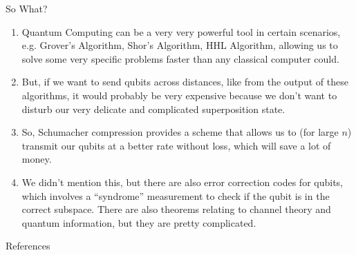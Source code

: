 \documentclass{beamer}
\begin{document}
\begin{frame}{So What?}
    \begin{enumerate}
        \item Quantum Computing can be a very very powerful tool in certain scenarios, e.g. Grover's Algorithm, Shor's Algorithm, HHL Algorithm, allowing us to solve some very specific problems faster than any classical computer could.
        \item But, if we want to send qubits across distances, like from the output of these algorithms, it would probably be very expensive because we don't want to disturb our very delicate and complicated superposition state.
        \item So, Schumacher compression provides a scheme that allows us to (for large $n$) transmit our qubits at a better rate without loss, which will save a lot of money.
        \item We didn't mention this, but there are also error correction codes for qubits, which involves a ``syndrome'' measurement to check if the qubit is in the correct subspace. There are also theorems relating to channel theory and quantum information, but they are pretty complicated.
    \end{enumerate}
\end{frame}

\begin{frame}{References}
    \nocite{preskill2022}
    \nocite{arxiv2016}
    \printbibliography
\end{frame}
\end{document}

